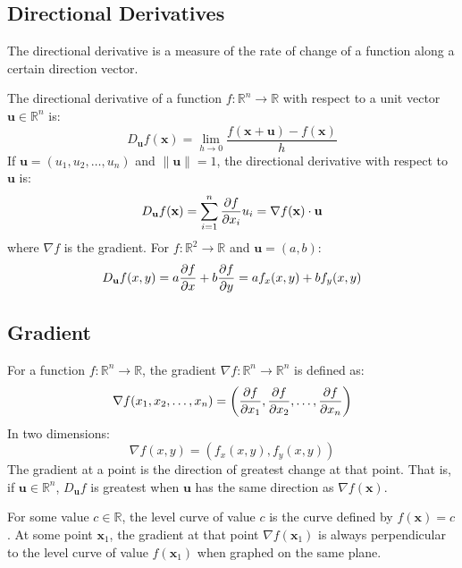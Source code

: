 \documentclass{article}
\begin{document}
\subsection{Directional Derivatives}

The directional derivative is a measure of the rate of change of a function along a certain direction vector.

The directional derivative of a function $f:\mathbb R^n\to\mathbb R$ with respect to a unit vector $\mathbf u\in\mathbb R^n$ is:
\begin{equation*}
    D_\mathbf u f(\mathbf x)=\lim_{h\to0}\frac{f(\mathbf x+\mathbf u)-f(\mathbf x)}{h}
\end{equation*}
If $\mathbf u=(u_1,u_2,\ldots,u_n)$ and $\lVert \mathbf u \rVert =1$, the directional derivative with respect to $\mathbf u$ is:
\begin{equation*}
	D_\mathbf u f(\mathbf x)
	=\sum_{i=1}^{n} \diffp{f}{x_i}u_i
	=\nabla f(\mathbf x)\cdot \mathbf u
\end{equation*}
where $\nabla f$ is the gradient. For $f:\mathbb R^2\to\mathbb R$ and $\mathbf u=(a,b)$:
\begin{equation*}
	D_\mathbf u f(x,y)
	=a\diffp fx+b\diffp fy
	=af_x(x,y)+bf_y(x,y)
\end{equation*}

\subsection{Gradient}

For a function $f:\mathbb R^n\to\mathbb R$, the gradient $\nabla f:\mathbb R^n\to\mathbb R^n$ is defined as:
\begin{equation*}
    \nabla f(x_1,x_2,\ldots,x_n)
	=\left( \diffp{f}{x_1},\diffp{f}{x_2},\ldots,\diffp{f}{x_n} \right)
\end{equation*}
In two dimensions:
\begin{equation*}
    \nabla f(x,y)=(f_x(x,y),f_y(x,y))
\end{equation*}
The gradient at a point is the direction of greatest change at that point. That is, if $\mathbf u\in\mathbb R^n$, $D_\mathbf u f$ is greatest when $\mathbf u$ has the same direction as $\nabla f(\mathbf x)$.

For some value $c\in\mathbb R$, the level curve of value $c$ is the curve defined by $f(\mathbf x)=c$. At some point $\mathbf x_1$, the gradient at that point $\nabla f(\mathbf x_1)$ is always perpendicular to the level curve of value $f(\mathbf x_1)$ when graphed on the same plane.
\end{document}
